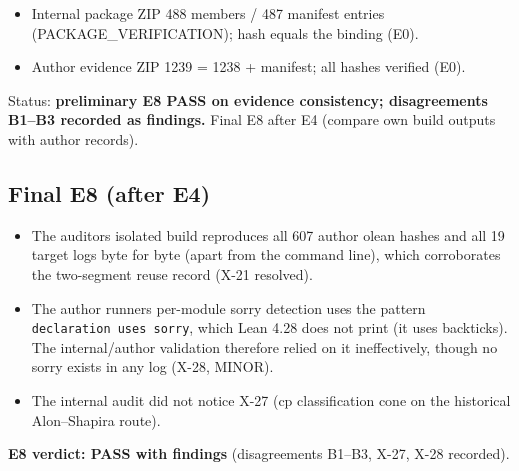\documentclass[
]{article}
\providecommand{\tightlist}{%
  \setlength{\itemsep}{0pt}\setlength{\parskip}{0pt}}
\begin{document}
\begin{itemize}
\tightlist
\item
  Internal package ZIP 488 members / 487 manifest entries
  (PACKAGE\_VERIFICATION); hash equals the binding (E0).
\item
  Author evidence ZIP 1239 = 1238 + manifest; all hashes verified (E0).
\end{itemize}

Status: \textbf{preliminary E8 PASS on evidence consistency;
disagreements B1--B3 recorded as findings.} Final E8 after E4 (compare
own build outputs with author records).

\subsection{Final E8 (after E4)}\label{final-e8-after-e4}

\begin{itemize}
\tightlist
\item
  The auditor\textquotesingle s isolated build reproduces all 607 author
  olean hashes and all 19 target logs byte for byte (apart from the
  command line), which corroborates the two-segment reuse record (X-21
  resolved).
\item
  The author runner\textquotesingle s per-module sorry detection uses
  the pattern
  \texttt{declaration\ uses\ \textquotesingle{}sorry\textquotesingle{}},
  which Lean 4.28 does not print (it uses backticks). The
  internal/author validation therefore relied on it ineffectively,
  though no sorry exists in any log (X-28, MINOR).
\item
  The internal audit did not notice X-27 (cp classification cone on the
  historical Alon--Shapira route).
\end{itemize}

\textbf{E8 verdict: PASS with findings} (disagreements B1--B3, X-27,
X-28 recorded).
\end{document}
